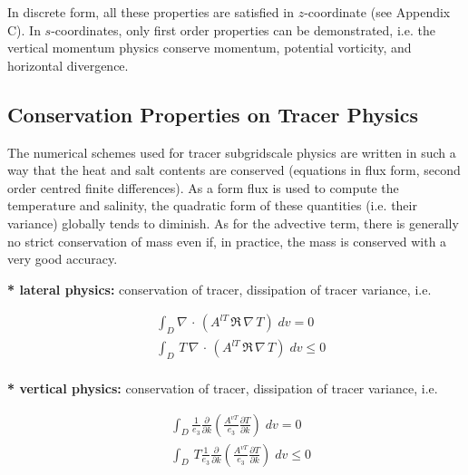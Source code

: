 In discrete form, all these properties are satisfied in $z$-coordinate (see 
Appendix C). In $s$-coordinates, only first order properties can be 
demonstrated, i.e. the vertical momentum physics conserve momentum, 
potential vorticity, and horizontal divergence.

\subsection{Conservation Properties on Tracer Physics}
\label{Invariant_tra_physics}

The numerical schemes used for tracer subgridscale physics are written in 
such a way that the heat and salt contents are conserved (equations in flux 
form, second order centred finite differences). As a form flux is used to 
compute the temperature and salinity, the quadratic form of these quantities 
(i.e. their variance) globally tends to diminish. As for the advective term, 
there is generally no strict conservation of mass even if, in practice, the 
mass is conserved with a very good accuracy. 

\textbf{* lateral physics: }conservation of tracer, dissipation of tracer 
variance, i.e.

\begin{equation} \label{Eq_traldf_t_t2}
\begin{aligned}
&\int_D \nabla\, \cdot\, \left( A^{lT} \,\Re \,\nabla \,T \right)\;dv = 0 \\ 
&\int_D \,T\, \nabla\, \cdot\, \left( A^{lT} \,\Re \,\nabla \,T \right)\;dv \leq 0 \\ 
\end{aligned}
\end{equation}

\textbf{* vertical physics: }conservation of tracer, dissipation of tracer 
variance, i.e.

\begin{equation} \label{Eq_trazdf_t_t2}
\begin{aligned}
& \int_D \frac{1}{e_3 } \frac{\partial }{\partial k}\left( \frac{A^{vT}}{e_3 }  \frac{\partial T}{\partial k}  \right)\;dv = 0 \\ 
& \int_D \,T \frac{1}{e_3 } \frac{\partial }{\partial k}\left( \frac{A^{vT}}{e_3 }  \frac{\partial T}{\partial k}  \right)\;dv \leq 0 \\ 
\end{aligned}
\end{equation}

